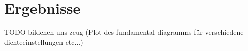 \chapter{Ergebnisse}
TODO bildchen uns zeug (Plot des fundamental diagramms für
verschiedene dichteeinstellungen etc...)


